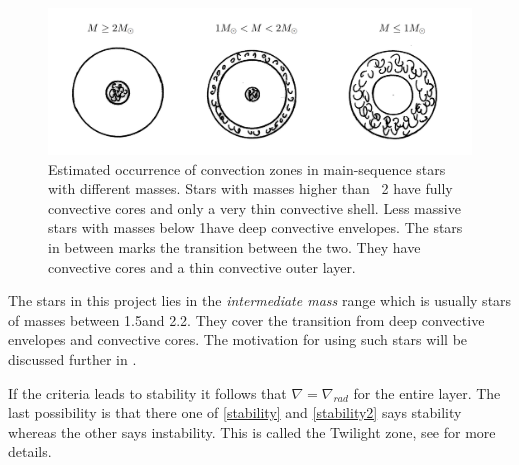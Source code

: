 \begin{figure}[htbp]
    \centering
    \includegraphics[width=1\textwidth]{convection_zones.png}
    \caption{Estimated occurrence of convection zones in main-sequence stars with different masses. Stars with masses higher than ~2 \msun have fully convective cores and only a very thin convective shell. Less massive stars with masses below 1\msun have deep convective envelopes. The stars in between marks the transition between the two. They have convective cores and a thin convective outer layer.}
    \label{convectionzones}
\end{figure}

The stars in this project lies in the \textit{intermediate mass} range which is usually stars of masses between 1.5\msun and 2.2\msun. They cover the transition from deep convective envelopes and convective cores. The motivation for using such stars will be discussed further in .

If the criteria leads to stability it follows that $\nabla = \nabla_{rad}$ for the entire layer. The  last possibility is that there one of \eqref{stability} and \eqref{stability2} says stability whereas the other says instability. This is called the Twilight zone, see \citep{kippenhahn1990stellar} for more details.
 
